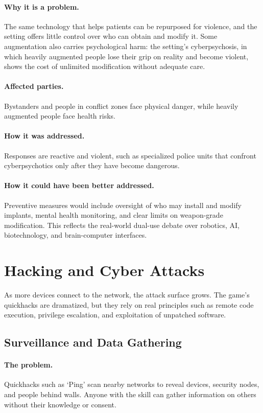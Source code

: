 \documentclass{article}%
\begin{document}
\paragraph{Why it is a problem.}
The same technology that helps patients can be repurposed for violence, and the setting offers little control over who can obtain and modify it. Some augmentation also carries psychological harm: the setting's cyberpsychosis, in which heavily augmented people lose their grip on reality and become violent, shows the cost of unlimited modification without adequate care.

\paragraph{Affected parties.}
Bystanders and people in conflict zones face physical danger, while heavily augmented people face health risks.

\paragraph{How it was addressed.}
Responses are reactive and violent, such as specialized police units that confront cyberpsychotics only after they have become dangerous.

\paragraph{How it could have been better addressed.}
Preventive measures would include oversight of who may install and modify implants, mental health monitoring, and clear limits on weapon-grade modification. This reflects the real-world dual-use debate over robotics, AI, biotechnology, and brain-computer interfaces.

\section{Hacking and Cyber Attacks}
As more devices connect to the network, the attack surface grows. The game's quickhacks are dramatized, but they rely on real principles such as remote code execution, privilege escalation, and exploitation of unpatched software.

\subsection{Surveillance and Data Gathering}

\paragraph{The problem.}
Quickhacks such as `Ping' scan nearby networks to reveal devices, security nodes, and people behind walls. Anyone with the skill can gather information on others without their knowledge or consent.
\end{document}
